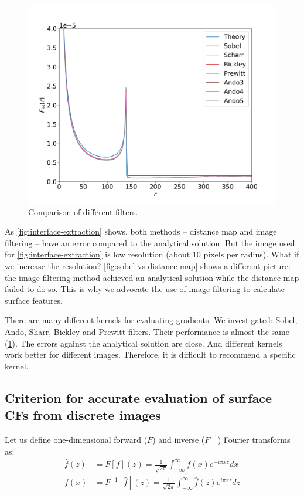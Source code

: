 \documentclass[reprint,amsmath,amssymb,aps,pre,showkeys,showpacs]{revtex4-1}
\begin{document}
\begin{figure}[ht]
  \centering
  \includegraphics[width=0.99\linewidth]{images/kernels.png}
  \caption{Comparison of different filters.}
  \label{fig:kernels}
\end{figure}

As \cref{fig:interface-extraction} shows, both methods -- distance map and image filtering --
have an error compared to the analytical solution. But the image used for
\cref{fig:interface-extraction} is low resolution (about 10 pixels per
radius). What if we increase the resolution? \cref{fig:sobel-vs-distance-map}
shows a different picture: the image filtering method achieved an analytical
solution  while the distance map failed to do so. This is why we advocate the
use of image filtering to calculate surface features.

There are many different kernels for evaluating gradients. We investigated:
Sobel, Ando, Sharr, Bickley and Prewitt filters. Their performance is almost the
same (\cref{fig:kernels}). The errors against the analytical solution are
close. And different kernels work better for different images. Therefore, it is
difficult to recommend a specific kernel.

\subsection{Criterion for accurate evaluation of surface CFs from discrete images}
\label{sec:crit}
Let us define one-dimensional forward ($F$) and inverse ($F^{-1}$) Fourier
transforms as:
\begin{align}
  \hat{f}(z) &= F[f](z) = \frac{1}{\sqrt{2\pi}}\int_{-\infty}^{\infty} f(x)
  e^{-i\pi xz} dx \label{eq:fourier-forward} \\
  f(x) &= F^{-1}[\hat{f}](z) = \frac{1}{\sqrt{2\pi}}\int_{-\infty}^{\infty} \hat{f}(z)
  e^{i\pi xz} dz \label{eq:fourier-backward}
\end{align}
\end{document}
